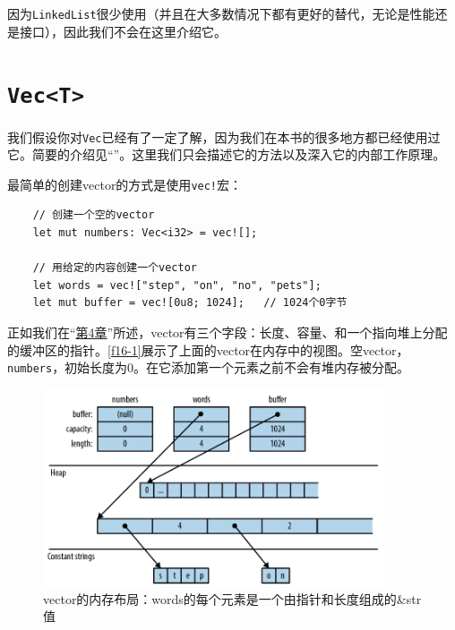 




因为\texttt{LinkedList}很少使用（并且在大多数情况下都有更好的替代，无论是性能还是接口），因此我们不会在这里介绍它。

\section{\texttt{Vec<T>}}

我们假设你对\texttt{Vec}已经有了一定了解，因为我们在本书的很多地方都已经使用过它。简要的介绍见“”。这里我们只会描述它的方法以及深入它的内部工作原理。

最简单的创建vector的方式是使用\texttt{vec!}宏：
\begin{verbatim}
    // 创建一个空的vector
    let mut numbers: Vec<i32> = vec![];

    // 用给定的内容创建一个vector
    let words = vec!["step", "on", "no", "pets"];
    let mut buffer = vec![0u8; 1024];   // 1024个0字节
\end{verbatim}

正如我们在“\hyperref[ch04]{第4章}”所述，vector有三个字段：长度、容量、和一个指向堆上分配的缓冲区的指针。\autoref{f16-1}展示了上面的vector在内存中的视图。空vector，\texttt{numbers}，初始长度为0。在它添加第一个元素之前不会有堆内存被分配。

\begin{figure}[htbp]
    \centering
    \includegraphics[width=0.9\textwidth]{../img/f16-1.png}
    \caption{vector的内存布局：words的每个元素是一个由指针和长度组成的\&str值}
    \label{f16-1}
\end{figure}

